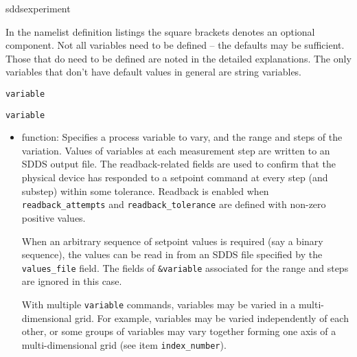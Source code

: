\begin{sddsprog}{sddsexperiment}
\begin{itemize}
In the namelist definition listings the square brackets denotes an optional component.
Not all variables need to be defined -- the defaults may be sufficient.
Those that do need to be defined are noted in the detailed explanations.
The only variables that don't have default values in general are string variables.


\begin{latexonly}
\newpage\begin{center}{\Large \verb+variable+}\end{center}
\end{latexonly}
\begin{htmlonly}
  \item {\Large \verb+variable+}
\end{htmlonly}
  \begin{itemize}
    \item function: Specifies a process variable to vary, and the range and steps of the variation.
        Values of variables at each measurement step are written to an SDDS output file.
        The readback-related fields are used to confirm that the physical device has responded
        to a setpoint command at every step (and substep) within some tolerance. Readback is enabled
        when {\verb+readback_attempts+} and {\verb+readback_tolerance+} are defined with non-zero positive values.

        When an arbitrary sequence of setpoint values is required (say a binary sequence),
        the values can be read in from an SDDS file specified by the {\verb+values_file+} field.
        The fields of \verb+&variable+ associated for the range and steps are ignored in this case.

         With multiple \verb+variable+ commands,
         variables may be varied in a multi-dimensional grid. For example,
        variables may be varied independently of each other, or some groups of
        variables may vary together forming one axis of a multi-dimensional grid
         (see item {\verb+index_number+}).


\end{itemize}
\end{itemize}
\end{sddsprog}
